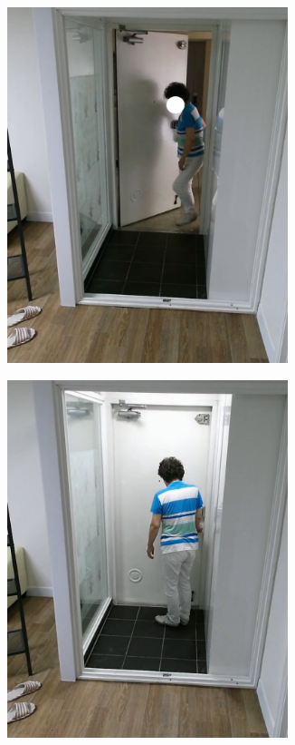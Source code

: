 \documentclass[thesis]{mas_proposal}
\begin{document}
\begin{figure}[htb!]
	\centering
	\begin{subfigure}[b]{0.22\textwidth}
		\centering
		\includegraphics[width=0.9\textwidth]{images/dataset/1.png}
		\subcaption{}%
		\label{subfig:normal_1}
	\end{subfigure}
	\begin{subfigure}[b]{0.22\textwidth}
		\centering
		\includegraphics[width=0.9\textwidth]{images/dataset/2.png}

\end{subfigure}
\end{figure}
\end{document}
